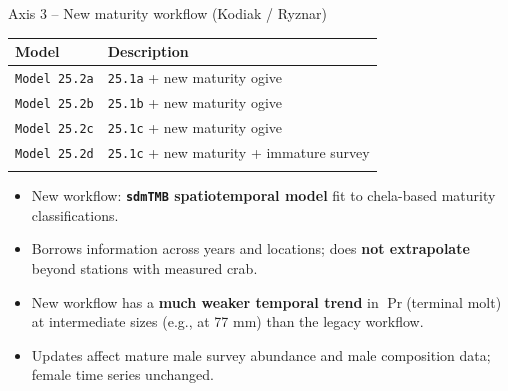 \documentclass[
  10pt,
  ignorenonframetext,
  aspectratio=169,
]{beamer}
\providecommand{\tightlist}{%
  \setlength{\itemsep}{0pt}\setlength{\parskip}{0pt}}
\begin{document}
\begin{frame}[fragile]{Axis 3 -- New maturity workflow (Kodiak /
Ryznar)}
\label{axis-3-new-maturity-workflow-kodiak-ryznar}
\small

\begin{longtable}[]{@{}ll@{}}
\toprule\noalign{}
Model & Description \\
\midrule\noalign{}
\endhead
\texttt{Model\ 25.2a} & \texttt{25.1a} + new maturity ogive \\
\texttt{Model\ 25.2b} & \texttt{25.1b} + new maturity ogive \\
\texttt{Model\ 25.2c} & \texttt{25.1c} + new maturity ogive \\
\texttt{Model\ 25.2d} & \texttt{25.1c} + new maturity + immature
survey \\
\bottomrule\noalign{}
\end{longtable}

\medskip

\begin{itemize}
\tightlist
\item
  New workflow: \textbf{\texttt{sdmTMB} spatiotemporal model} fit to
  chela-based maturity classifications.
\item
  Borrows information across years and locations; does \textbf{not
  extrapolate} beyond stations with measured crab.
\item
  New workflow has a \textbf{much weaker temporal trend} in
  \(\Pr\)(terminal molt) at intermediate sizes (e.g., at 77 mm) than the
  legacy workflow.
\item
  Updates affect mature male survey abundance and male composition data;
  female time series unchanged.
\end{itemize}
\end{frame}
\end{document}
